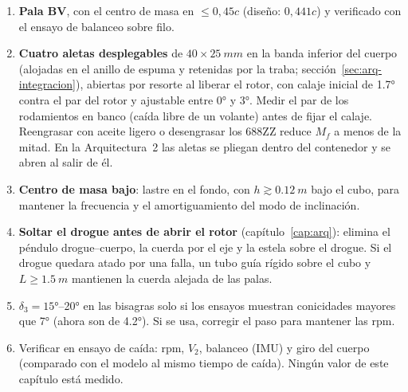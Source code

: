 \begin{enumerate}
  \item \textbf{Pala BV}, con el centro de masa en $\le0{,}45c$ (diseño: $0{,}441c$) y verificado con el
        ensayo de balanceo sobre filo.
  \item \textbf{Cuatro aletas desplegables} de $40\times\SI{25}{mm}$ en la banda inferior
        del cuerpo (alojadas en el anillo de espuma y retenidas por la traba; sección~\ref{sec:arq-integracion}),
        abiertas por resorte al liberar el rotor, con calaje inicial de
        \ang{1.7} contra el par del rotor y ajustable entre \ang{0} y \ang{3}. Medir el
        par de los rodamientos en banco (caída libre de un volante) antes de fijar el
        calaje. Reengrasar con aceite ligero o desengrasar los 688ZZ reduce $M_f$ a
        menos de la mitad. En la Arquitectura~2 las aletas se pliegan dentro del
        contenedor y se abren al salir de él.
  \item \textbf{Centro de masa bajo}: lastre en el fondo, con
        $h\gtrsim\SI{0.12}{m}$ bajo el cubo, para mantener la frecuencia y el
        amortiguamiento del modo de inclinación.
  \item \textbf{Soltar el drogue antes de abrir el rotor} (capítulo~\ref{cap:arq}): elimina
        el péndulo drogue--cuerpo, la cuerda por el eje y la estela sobre el drogue. Si
        el drogue quedara atado por una falla, un tubo guía rígido sobre el cubo y
        $L\ge\SI{1.5}{m}$ mantienen la cuerda alejada de las palas.
  \item $\delta_3=\ang{15}$--\ang{20} en las bisagras solo si los ensayos muestran
        conicidades mayores que \ang{7} (ahora son de \ang{4.2}). Si se usa, corregir el paso para mantener las
        rpm.
  \item Verificar en ensayo de caída: rpm, $V_2$, balanceo (IMU) y giro del cuerpo
        (comparado con el modelo al mismo tiempo de caída). Ningún valor de este capítulo
        está medido.
\end{enumerate}

